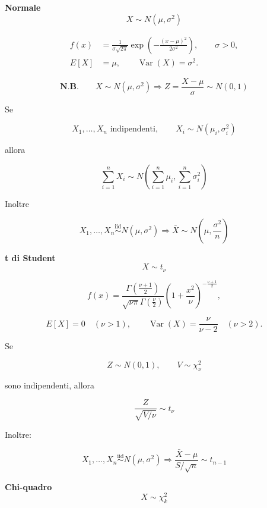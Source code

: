 \documentclass{article}
\begin{document}

\noindent\textbf{Normale} \[ \boxed{X\sim N(\mu,\sigma^2)} \]

\[
\begin{aligned}
f(x)
&=
\frac1{\sigma\sqrt{2\pi}}
\exp\left(
-\frac{(x-\mu)^2}{2\sigma^2}
\right),\qquad \sigma>0,
\\[0.5em]
E[X]
&=
\mu,
\qquad
\operatorname{Var}(X)=\sigma^2.
\end{aligned}
\]

\vspace{10pt}

\[
\boxed{
\textbf{N.B.}\qquad
X\sim N(\mu,\sigma^2)
\Rightarrow
Z=\frac{X-\mu}{\sigma}\sim N(0,1)
}
\]

\newpage

Se

\[
X_1,\ldots,X_n \text{ indipendenti},
\qquad
X_i\sim N(\mu_i,\sigma_i^2)
\]

allora

\[
\sum_{i=1}^{n}X_i
\sim
N\left(
\sum_{i=1}^{n}\mu_i,
\sum_{i=1}^{n}\sigma_i^2
\right)
\]

Inoltre

\[
X_1,\ldots,X_n
\stackrel{\mathrm{iid}}{\sim}
N(\mu,\sigma^2)
\Rightarrow
\bar X
\sim
N\left(
\mu,\frac{\sigma^2}{n}
\right)
\]


\noindent\textbf{t di Student} \[ \boxed{X\sim t_\nu} \]

\[
f(x)
=
\frac{\Gamma\!\left(\frac{\nu+1}{2}\right)}
{\sqrt{\nu\pi}\Gamma\!\left(\frac{\nu}{2}\right)}
\left(1+\frac{x^2}{\nu}\right)^{-\frac{\nu+1}{2}},
\]

\[
E[X]=0
\quad(\nu>1),
\qquad
\operatorname{Var}(X)
=
\frac{\nu}{\nu-2}
\quad(\nu>2).
\]

Se

\[
Z\sim N(0,1),
\qquad
V\sim\chi^2_\nu
\]

sono indipendenti, allora

\[
\frac{Z}{\sqrt{V/\nu}}
\sim t_\nu
\]

Inoltre:

\[
X_1,\ldots,X_n
\stackrel{\mathrm{iid}}{\sim}
N(\mu,\sigma^2)
\Rightarrow
\frac{\bar X-\mu}{S/\sqrt n}
\sim t_{n-1}
\]


\noindent\textbf{Chi-quadro} \[ \boxed{X\sim\chi^2_k} \]
\end{document}

